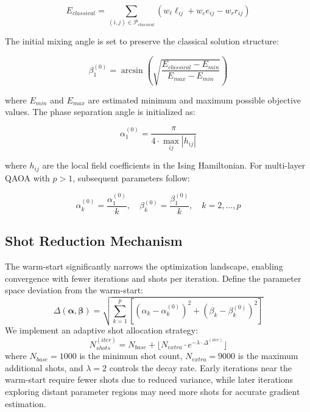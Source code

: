 \documentclass[lettersize,journal]{IEEEtran}
\begin{document}
\begin{equation}
E_{classical} = \sum_{(i,j) \in \mathcal{P}_{classical}} \left(w_\ell \ell_{ij} + w_e e_{ij} - w_r r_{ij}\right)
\label{eq:classical_energy}
\end{equation}

The initial mixing angle is set to preserve the classical solution structure:

\begin{equation}
\beta_1^{(0)} = \arcsin\left(\sqrt{\frac{E_{classical} - E_{min}}{E_{max} - E_{min}}}\right)
\label{eq:initial_beta}
\end{equation}

where $E_{min}$ and $E_{max}$ are estimated minimum and maximum possible objective values. The phase separation angle is initialized as:

\begin{equation}
\alpha_1^{(0)} = \frac{\pi}{4 \cdot \max_{ij}|h_{ij}|}
\label{eq:initial_alpha}
\end{equation}

where $h_{ij}$ are the local field coefficients in the Ising Hamiltonian. For multi-layer QAOA with $p > 1$, subsequent parameters follow:

\begin{equation}
\alpha_k^{(0)} = \frac{\alpha_1^{(0)}}{k}, \quad \beta_k^{(0)} = \frac{\beta_1^{(0)}}{k}, \quad k = 2, \ldots, p
\label{eq:multi_layer_params}
\end{equation}

\subsection{Shot Reduction Mechanism}
\label{subsec:shot_reduction}

The warm-start significantly narrows the optimization landscape, enabling convergence with fewer iterations and shots per iteration. Define the parameter space deviation from the warm-start:
\begin{equation}
\Delta(\boldsymbol{\alpha}, \boldsymbol{\beta}) = \sqrt{\sum_{k=1}^{p} \left[(\alpha_k - \alpha_k^{(0)})^2 + (\beta_k - \beta_k^{(0)})^2\right]}
\label{eq:param_deviation}
\end{equation}
We implement an adaptive shot allocation strategy:
\begin{equation}
N_{shots}^{(iter)} = N_{base} + \lfloor N_{extra} \cdot e^{-\lambda \cdot \Delta^{(iter)}} \rfloor
\label{eq:adaptive_shots}
\end{equation}
where $N_{base} = 1000$ is the minimum shot count, $N_{extra} = 9000$ is the maximum additional shots, and $\lambda = 2$ controls the decay rate. Early iterations near the warm-start require fewer shots due to reduced variance, while later iterations exploring distant parameter regions may need more shots for accurate gradient estimation.
\end{document}
